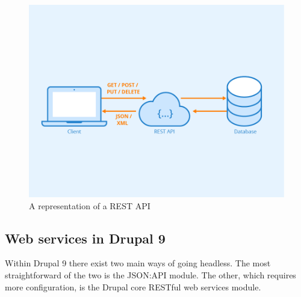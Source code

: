 \begin{figure}
	\centering
	\includegraphics{./img/Rest-API.png}
	\caption[REST API]{A representation of a REST API ~\autocite{Seobility}}
\end{figure}

\subsection{Web services in Drupal 9}
Within Drupal 9 there exist two main ways of going headless. The most straightforward of the two is the JSON:API module. The other, which requires more configuration, is the Drupal core RESTful web services module.



